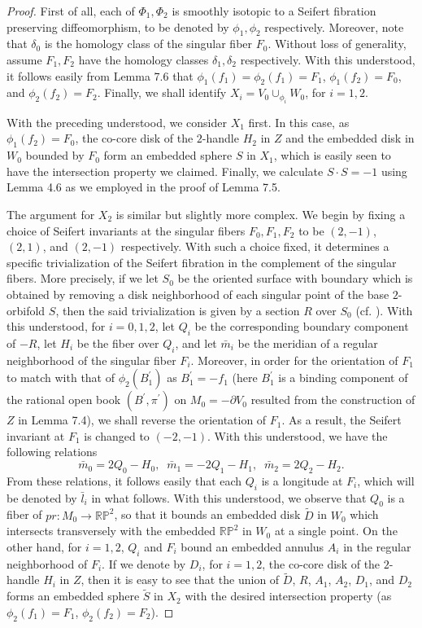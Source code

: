 \documentclass[11pt]{amsart}
\theoremstyle{plain}
\numberwithin{theorem}{section}
\theoremstyle{definition}
\newcommand{\R}{{\mathbb R}}
\renewcommand{\P}{{\mathbb P}}
\begin{document}
\begin{proof}
First of all, each of $\Phi_1,\Phi_2$ is smoothly isotopic to a Seifert fibration preserving diffeomorphism, to be denoted by $\phi_1,\phi_2$ respectively. Moreover, note that $\delta_0$
is the homology class of the singular fiber $F_0$. Without loss of generality, assume $F_1,F_2$
have the homology classes $\delta_1,\delta_2$ respectively. With this understood, it follows easily
from Lemma 7.6 that $\phi_1(f_1)=\phi_2(f_1)=F_1$, $\phi_1(f_2)=F_0$, and $\phi_2(f_2)=F_2$.
Finally, we shall identify $X_i=V_0\cup_{\phi_i} W_0$, for $i=1,2$.

With the preceding understood, we consider $X_1$ first. In this case, as $\phi_1(f_2)=F_0$,
the co-core disk of the $2$-handle $H_2$ in $Z$ and the embedded disk in $W_0$ bounded by
$F_0$ form an embedded sphere $S$ in $X_1$, which is easily seen to have the intersection property we claimed. Finally, we calculate $S\cdot S=-1$ using Lemma 4.6 as we employed in the proof of Lemma 7.5. 

The argument for $X_2$ is similar but slightly more complex. We begin by fixing a choice of Seifert invariants at the singular fibers
$F_0,F_1,F_2$ to be $(2,-1)$, $(2,1)$, and $(2,-1)$ respectively. With such a choice fixed, it determines a specific trivialization of the Seifert fibration in the complement of the singular fibers. 
More precisely, if we let $S_0$ be the oriented surface with boundary which is obtained by removing 
a disk neighborhood of each singular point of the base $2$-orbifold $S$, then the said trivialization is given by a section $R$ over $S_0$ (cf. \cite{N}). With this understood, for $i=0,1,2$, let $Q_i$ be the corresponding boundary component of $-R$, let $H_i$ be the fiber over $Q_i$, and let $\bar{m}_i$ be the meridian of a regular neighborhood of the singular fiber $F_i$. Moreover, in order for the orientation of $F_1$ to match with that of $\phi_2(B_1^\prime)$ as $B_1^\prime=-f_1$ (here 
$B_1^\prime$ is a binding component of the rational open book $(B^\prime,\pi^\prime)$ 
on $M_0=-\partial V_0$ resulted from the construction of $Z$ in Lemma 7.4), we shall reverse the orientation of $F_1$. As a result, the Seifert invariant at $F_1$ is changed to $(-2,-1)$. With
this understood, we have the following relations
$$
\bar{m}_0=2Q_0-H_0, \;\;  \bar{m}_1=-2Q_1-H_1, \;\; \bar{m}_2=2Q_2-H_2.
$$
From these relations, it follows easily that each $Q_i$ is a longitude at $F_i$, which will be denoted 
by $\bar{l}_i$ in what follows. With this understood, we observe that $Q_0$ is a fiber of $pr: M_0
\rightarrow \R\P^2$, so that it bounds an embedded disk $\tilde{D}$ in $W_0$ which intersects transversely with the embedded $\R\P^2$ in $W_0$ at a single point. On the other hand, for $i=1,2$, $Q_i$ and $F_i$ bound an embedded annulus $A_i$ in the regular neighborhood of $F_i$. If we denote by $D_i$, for $i=1,2$, the co-core disk of the $2$-handle $H_i$ in $Z$, then it is easy to see that the union of $\tilde{D}$, $R$, $A_1$, $A_2$, $D_1$, and $D_2$ forms an embedded sphere 
$\tilde{S}$ in $X_2$ with the desired intersection property 
(as $\phi_2(f_1)=F_1$, $\phi_2(f_2)=F_2$). 


\end{proof}
\end{document}
